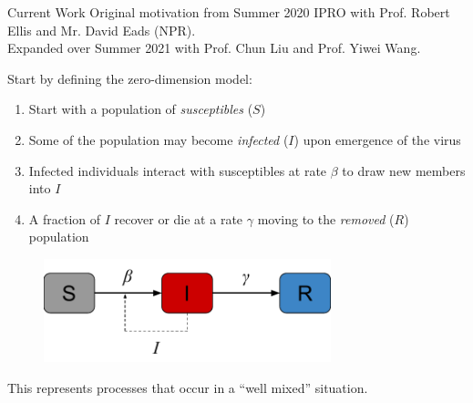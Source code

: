 \begin{slide}{Current Work}
	Original motivation from Summer 2020 IPRO with Prof. Robert Ellis and Mr. David Eads (NPR). \\
	Expanded over Summer 2021 with Prof. Chun Liu and Prof. Yiwei Wang. \\
	
	\vspace{.5cm}
	
	{\large Start by defining the zero-dimension model:}
	\begin{enumerate}
		\item Start with a population of \emph{susceptibles} ($S$)
		\item Some of the population may become \emph{infected} ($I$) upon emergence of the virus
		\item Infected individuals interact with susceptibles at rate $\beta$ to draw new members into $I$
		\item A fraction of $I$ recover or die at a rate $\gamma$ moving to the \emph{removed} ($R$) population
	\end{enumerate}
	\begin{figure}
		\centering
		\includegraphics[height=3cm]{images/sir_schematic}
	\end{figure}
	This represents processes that occur in a ``well mixed'' situation.
\end{slide}